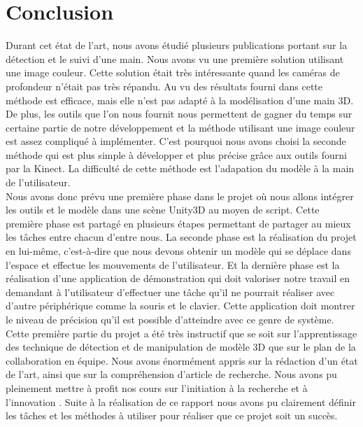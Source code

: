 \chapter*{Conclusion}
Durant cet état de l'art, nous avons étudié plusieurs publications portant sur la détection et le suivi
d'une main. Nous avons vu une première solution utilisant une image couleur. Cette solution était très
intéressante quand les caméras de profondeur n'était pas très répandu. Au vu des résultats fourni dans
\cite{haarlike} cette méthode est efficace, mais elle n'est pas adapté à la modélisation d'une main 3D. 
De plus, les outils que l'on nous fournit nous permettent
de gagner du temps sur certaine partie de notre développement et la méthode utilisant une image couleur
est assez compliqué à implémenter. C'est pourquoi nous avons choisi la seconde méthode qui est plus
simple à développer et plus précise grâce aux outils fourni par la Kinect. La difficulté de cette méthode
est l'adapation du modèle à la main de l'utilisateur.\\

Nous avons donc prévu une première phase dans le projet où nous allons intégrer les outils et le modèle
dans une scène Unity3D au moyen de script. Cette première phase est partagé en plusieurs étapes permettant
de partager au mieux les tâches entre chacun d'entre nous. La seconde phase est la réalisation du projet en lui-même, c'est-à-dire 
que nous devons obtenir un modèle qui se déplace dans l'espace et effectue les mouvements de l'utilisateur.
Et la dernière phase est la réalisation d'une application de démonstration qui doit valoriser notre travail
en demandant à l'utilisateur d'effectuer une tâche qu'il ne pourrait réaliser avec d'autre périphérique comme
la souris et le clavier. Cette application doit montrer le niveau de précision qu'il est possible d'atteindre
avec ce genre de système.\\

Cette première partie du projet a été très instructif que se soit sur l'apprentissage des technique de détection et de manipulation
de modèle 3D que sur le plan de la collaboration en équipe. Nous avons énormément appris sur la rédaction d'un
état de l'art, ainsi que sur la compréhension d'article de recherche. Nous avons pu pleinement mettre à profit
nos cours sur \og l'initiation à la recherche et à l'innovation \fg. Suite à la réalisation de ce rapport nous avons pu
clairement définir les tâches et les méthodes à utiliser pour réaliser que ce projet soit un succès. 
